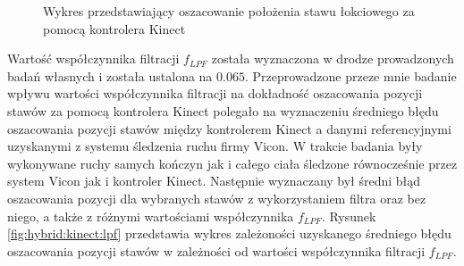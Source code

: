 \begin{figure}[!htb]
	\centering
						
						
	\caption{Wykres przedstawiający oszacowanie położenia stawu łokciowego za pomocą kontrolera Kinect}
\end{figure}

Wartość współczynnika filtracji $f_{LPF}$ została wyznaczona w drodze prowadzonych badań własnych i została ustalona na $0.065$. Przeprowadzone przeze mnie badanie 
wpływu wartości współczynnika filtracji na dokładność oszacowania pozycji stawów za pomocą kontrolera Kinect polegało na wyznaczeniu średniego błędu oszacowania pozycji stawów między kontrolerem Kinect a danymi referencyjnymi uzyskanymi z systemu śledzenia ruchu firmy Vicon. W trakcie badania były wykonywane ruchy samych kończyn jak i całego ciała śledzone równocześnie przez system Vicon jak i kontroler Kinect. Następnie wyznaczany był średni błąd oszacowania pozycji dla wybranych stawów z wykorzystaniem filtra oraz bez niego, a także z różnymi wartościami współczynnika $f_{LPF}$. Rysunek \ref{fig:hybrid:kinect:lpf} przedstawia wykres zależoności uzyskanego średniego błędu oszacowania pozycji stawów w zależności od wartości współczynnika filtracji $f_{LPF}$.

